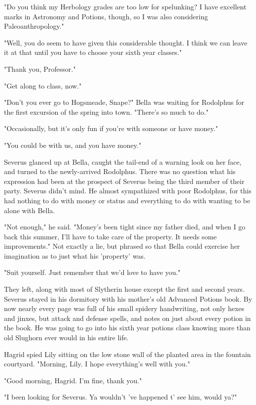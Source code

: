 \documentclass[a4paper,11pt]{article}
\begin{document}
"Do you think my Herbology grades are too low for spelunking? I have excellent marks in Astronomy and Potions, though, so I was also considering Paleoanthropology."

"Well, you do seem to have given this considerable thought. I think we can leave it at that until you have to choose your sixth year classes."

"Thank you, Professor."

"Get along to class, now."

"Don't you ever go to Hogsmeade, Snape?" Bella was waiting for Rodolphus for the first excursion of the spring into town. "There's so much to do."

"Occasionally, but it's only fun if you're with someone or have money."

"You could be with us, and you have money."

Severus glanced up at Bella, caught the tail-end of a warning look on her face, and turned to the newly-arrived Rodolphus. There was no question what his expression had been at the prospect of Severus being the third member of their party. Severus didn't mind. He almost sympathized with poor Rodolphus, for this had nothing to do with money or status and everything to do with wanting to be alone with Bella.

"Not enough," he said. "Money's been tight since my father died, and when I go back this summer, I'll have to take care of the property. It needs some improvements." Not exactly a lie, but phrased so that Bella could exercise her imagination as to just what his 'property' was.

"Suit yourself. Just remember that we'd love to have you."

They left, along with most of Slytherin house except the first and second years. Severus stayed in his dormitory with his mother's old Advanced Potions book. By now nearly every page was full of his small spidery handwriting, not only hexes and jinxes, but attack and defense spells, and notes on just about every potion in the book. He was going to go into his sixth year potions class knowing more than old Slughorn ever would in his entire life.

Hagrid spied Lily sitting on the low stone wall of the planted area in the fountain courtyard. "Morning, Lily. I hope everything's well with you."

"Good morning, Hagrid. I'm fine, thank you."

"I been looking for Severus. Ya wouldn't 've happened t' see him, would ya?"
\end{document}
